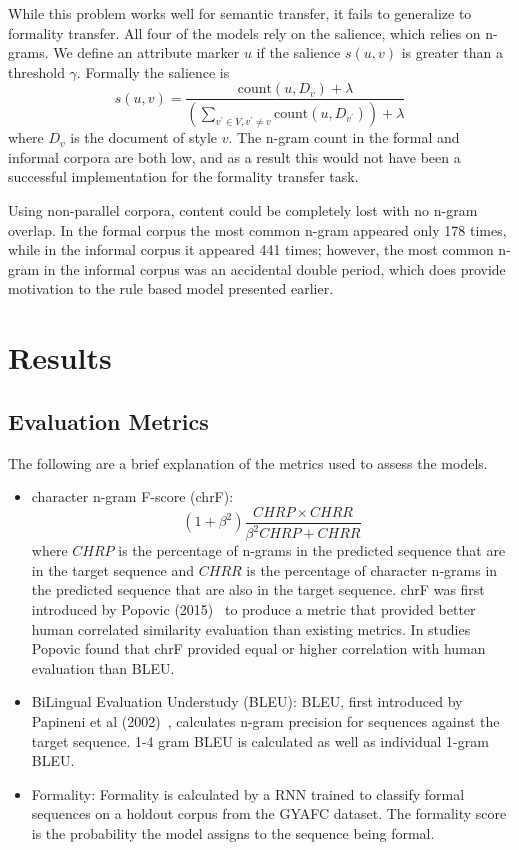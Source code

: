 \documentclass[12pt]{article}
\begin{document}
While this problem works well for semantic transfer, it fails to generalize 
to formality transfer. All four of the models rely on the salience, which relies 
on n-grams. 
We define an attribute marker $u$ if the salience $s(u,v)$ is 
greater than a threshold $\gamma$. Formally the salience is 
$$ s(u,v) = \frac{\text{count}(u, D_v) + \lambda}{(\sum_{v^\prime \in V, v^\prime \neq v} \text{count}(u, D_{v^\prime })) + \lambda} $$
where $D_v$ is the document of style $v$. The n-gram count in the formal and informal corpora
are both low, and as a result this would not have been a successful implementation for the 
formality transfer task. \par
Using non-parallel corpora, content could be completely lost with no n-gram overlap. In the
formal corpus the most common n-gram appeared only 178 times, while in the informal corpus it appeared 
441 times;
however, the most common n-gram in the informal corpus was an accidental double period, which does
provide motivation to the rule based model presented earlier.



\section{Results}
\subsection{Evaluation Metrics}
The following are a brief explanation of the metrics used to assess the models. 
\begin{itemize}
    \item character n-gram F-score (chrF): 
    $$ (1 + \beta^2) \frac{CHRP \times CHRR}{\beta^2 CHRP + CHRR} $$
    where $CHRP$ is the percentage of n-grams in the predicted sequence that are 
    in the target sequence and $CHRR$ is the percentage of character n-grams in 
    the predicted sequence that are also in the target sequence.  chrF was first 
    introduced by Popovic (2015)~\cite{chrf} to produce a metric that provided 
    better human correlated similarity evaluation than existing metrics. In studies
    Popovic found that chrF provided equal or higher correlation with human evaluation
    than BLEU. 
    \item BiLingual Evaluation Understudy (BLEU): BLEU, first introduced by Papineni et al 
    (2002)~\cite{papineni-etal-2002-bleu}, calculates n-gram precision 
    for sequences against the target sequence. 1-4 gram BLEU is calculated as well
    as individual 1-gram BLEU.
    \item  Formality: Formality is calculated by a RNN trained to classify formal 
    sequences on a holdout corpus from the GYAFC dataset. The formality score is 
    the probability the model assigns to the sequence being formal. 
\end{itemize}
\end{document}
